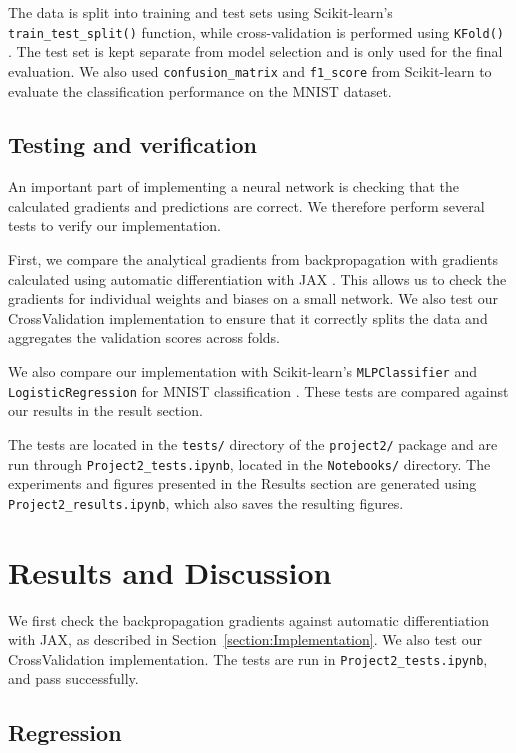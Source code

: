 \documentclass[amssymb,secnumarabic,twocolumn,aps]{revtex4}
\begin{document}
The data is split into training and test sets using Scikit-learn's \texttt{train\_test\_split()} function, while cross-validation is performed using \texttt{KFold()} \cite{scikit-learn}. The test set is kept separate from model selection and is only used for the final evaluation. We also used \texttt{confusion\_matrix} and \texttt{f1\_score} from Scikit-learn to evaluate the classification performance on the MNIST dataset.

\subsection{Testing and verification}

An important part of implementing a neural network is checking that the calculated gradients and predictions are correct. We therefore perform several tests to verify our implementation.

First, we compare the analytical gradients from backpropagation with gradients calculated using automatic differentiation with JAX \cite{jax}. This allows us to check the gradients for individual weights and biases on a small network. We also test our CrossValidation implementation to ensure that it correctly splits the data and aggregates the validation scores across folds.

We also compare our implementation with Scikit-learn's \texttt{MLPClassifier} and \texttt{LogisticRegression} for MNIST classification \cite{scikit-learn}. These tests are compared against our results in the result section.

The tests are located in the \texttt{tests/} directory of the \texttt{project2/} package and are run through \texttt{Project2\_tests.ipynb}, located in the \texttt{Notebooks/} directory. The experiments and figures presented in the Results section are generated using \texttt{Project2\_results.ipynb}, which also saves the resulting figures.

\section{Results and Discussion}\label{section:results}

We first check the backpropagation gradients against automatic differentiation with JAX, as described in Section~\ref{section:Implementation}. We also test our CrossValidation implementation. The tests are run in \texttt{Project2\_tests.ipynb}, and pass successfully.

\subsection{Regression}\label{sec:results_regression}
\end{document}
